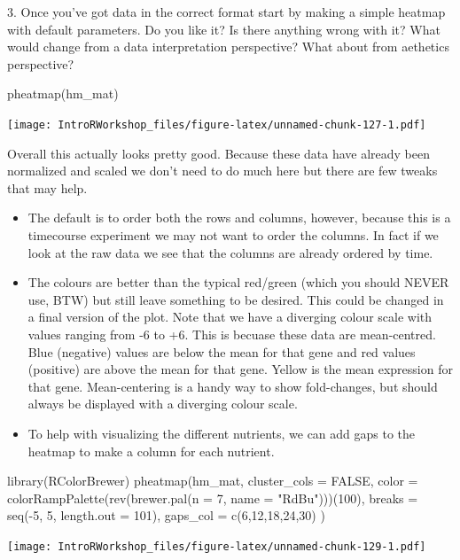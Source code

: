 \documentclass[
]{book}
\newenvironment{Shaded}{\begin{snugshade}}{\end{snugshade}}
\newcommand{\AttributeTok}[1]{\textcolor[rgb]{0.77,0.63,0.00}{#1}}
\newcommand{\ConstantTok}[1]{\textcolor[rgb]{0.00,0.00,0.00}{#1}}
\newcommand{\DecValTok}[1]{\textcolor[rgb]{0.00,0.00,0.81}{#1}}
\newcommand{\FunctionTok}[1]{\textcolor[rgb]{0.00,0.00,0.00}{#1}}
\newcommand{\NormalTok}[1]{#1}
\newcommand{\SpecialCharTok}[1]{\textcolor[rgb]{0.00,0.00,0.00}{#1}}
\newcommand{\StringTok}[1]{\textcolor[rgb]{0.31,0.60,0.02}{#1}}
\providecommand{\tightlist}{%
  \setlength{\itemsep}{0pt}\setlength{\parskip}{0pt}}
\begin{document}
3. Once you've got data in the correct format start by making a simple heatmap with default parameters. Do you like it? Is there anything wrong with it? What would change from a data interpretation perspective? What about from aethetics perspective?

\begin{Shaded}
\begin{Highlighting}[]
\FunctionTok{pheatmap}\NormalTok{(hm\_mat)}
\end{Highlighting}
\end{Shaded}

\texttt{[image: IntroRWorkshop\_files/figure-latex/unnamed-chunk-127-1.pdf]}

Overall this actually looks pretty good. Because these data have already been normalized and scaled we don't need to do much here but there are few tweaks that may help.

\begin{itemize}
\tightlist
\item
  The default is to order both the rows and columns, however, because this is a timecourse experiment we may not want to order the columns. In fact if we look at the raw data we see that the columns are already ordered by time.
\item
  The colours are better than the typical red/green (which you should NEVER use, BTW) but still leave something to be desired. This could be changed in a final version of the plot. Note that we have a diverging colour scale with values ranging from -6 to +6. This is becuase these data are mean-centred. Blue (negative) values are below the mean for that gene and red values (positive) are above the mean for that gene. Yellow is the mean expression for that gene. Mean-centering is a handy way to show fold-changes, but should always be displayed with a diverging colour scale.
\item
  To help with visualizing the different nutrients, we can add gaps to the heatmap to make a column for each nutrient.
\end{itemize}

\begin{Shaded}
\begin{Highlighting}[]
\FunctionTok{library}\NormalTok{(RColorBrewer)}
\FunctionTok{pheatmap}\NormalTok{(hm\_mat,}
         \AttributeTok{cluster\_cols =} \ConstantTok{FALSE}\NormalTok{,}
         \AttributeTok{color =} \FunctionTok{colorRampPalette}\NormalTok{(}\FunctionTok{rev}\NormalTok{(}\FunctionTok{brewer.pal}\NormalTok{(}\AttributeTok{n =} \DecValTok{7}\NormalTok{, }\AttributeTok{name =} \StringTok{"RdBu"}\NormalTok{)))(}\DecValTok{100}\NormalTok{),}
         \AttributeTok{breaks =} \FunctionTok{seq}\NormalTok{(}\SpecialCharTok{{-}}\DecValTok{5}\NormalTok{, }\DecValTok{5}\NormalTok{, }\AttributeTok{length.out =} \DecValTok{101}\NormalTok{),}
         \AttributeTok{gaps\_col =} \FunctionTok{c}\NormalTok{(}\DecValTok{6}\NormalTok{,}\DecValTok{12}\NormalTok{,}\DecValTok{18}\NormalTok{,}\DecValTok{24}\NormalTok{,}\DecValTok{30}\NormalTok{)}
\NormalTok{)}
\end{Highlighting}
\end{Shaded}

\texttt{[image: IntroRWorkshop\_files/figure-latex/unnamed-chunk-129-1.pdf]}

  
\end{document}
